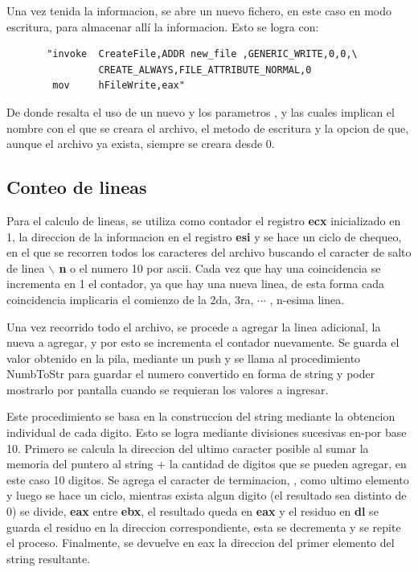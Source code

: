     Una vez tenida la informacion, se abre un nuevo fichero, en este caso en
    modo escritura, para almacenar allí la informacion. Esto se logra con:

    \begin{Verbatim}
       "invoke  CreateFile,ADDR new_file ,GENERIC_WRITE,0,0,\
                CREATE_ALWAYS,FILE_ATTRIBUTE_NORMAL,0
        mov     hFileWrite,eax"
    \end{Verbatim}

    De donde resalta el uso de un nuevo  y los parametros
    \comillas{ADDR new\_file}, \comillas{GENERIC\_WRITE} y 
    las cuales implican el nombre con el que se creara el archivo, el metodo de
    escritura y la opcion de que, aunque el archivo ya exista, siempre se creara
    desde 0.

\subsection*{Conteo de lineas}

    Para el calculo de lineas, se utiliza como contador el registro \textbf{ecx}
    inicializado en 1, la direccion de la informacion en el registro \textbf{esi}
    y se hace un ciclo de chequeo, en el que se recorren todos los caracteres
    del archivo buscando el caracter de salto de linea \textbf{$\backslash$ n} o
    el numero 10 por ascii. Cada vez que hay una coincidencia se incrementa en
    1 el contador, ya que hay una nueva linea, de esta forma cada coincidencia
    implicaria el comienzo de la 2da, 3ra, $\cdots$ , n-esima linea.

    Una vez recorrido todo el archivo, se procede a agregar la linea adicional,
    la nueva a agregar, y por esto se incrementa el contador nuevamente. Se
    guarda el valor obtenido en la pila, mediante un push y se llama al
    procedimiento NumbToStr para guardar el numero convertido en forma de string
    y poder mostrarlo por pantalla cuando se requieran los valores a ingresar.

    Este procedimiento se basa en la construccion del string mediante la obtencion
    individual de cada digito. Esto se logra mediante divisiones sucesivas en-por
    base 10. Primero se calcula la direccion del ultimo caracter posible al
    sumar la memoria del puntero al string + la cantidad de digitos que se
    pueden agregar, en este caso 10 digitos. Se agrega el caracter de terminacion,
    \comillas{0}, como ultimo elemento y luego se hace un ciclo, mientras exista
    algun digito (el resultado sea distinto de 0) se divide, \textbf{eax} entre
    \textbf{ebx}, el resultado queda en \textbf{eax} y el residuo en \textbf{dl}
    se guarda el residuo en la direccion correspondiente, esta se decrementa y se
    repite el proceso. Finalmente, se devuelve en eax la direccion del primer
    elemento del string resultante.


